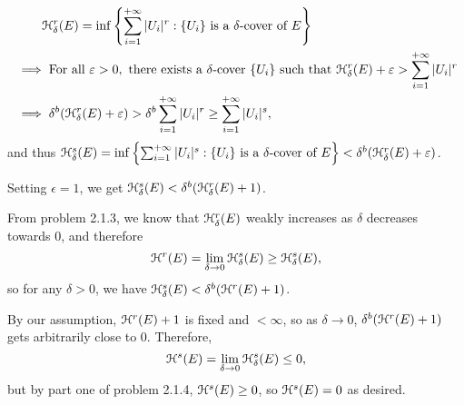\begin{enumerate}
    \begin{align*}
        &\phantom{\implies} \mathcal{H}_\delta^r(E) = \inf \left\{\sum_{i = 1}^{+\infty} |U_i|^r : \{U_i\} \text{ is a } \delta \text{-cover of } E\right\}\\
        &\implies \text{For all }\varepsilon > 0, \text{ there exists a }\delta\text{-cover }\{U_i\} \text{ such that } \mathcal{H}_{\delta}^r(E) + \varepsilon > \sum_{i = 1}^{+\infty} |U_i|^r\\
        &\implies \delta^b (\mathcal{H}_\delta^r(E) + \varepsilon) > \delta^b \sum_{i = 1}^{+\infty} |U_i|^r \geq \sum_{i = 1}^{+\infty} |U_i|^s,
    \end{align*}
    and thus \(\mathcal{H}_\delta^s(E) = \inf \left\{\sum_{i = 1}^{+\infty} |U_i|^s : \{U_i\} \text{ is a } \delta \text{-cover of } E\right\} < \delta^b (\mathcal{H}_\delta^r(E) + \varepsilon)\).

    Setting \(\epsilon = 1\), we get \(\mathcal{H}_\delta^s(E) < \delta^b (\mathcal{H}_\delta^r(E) + 1)\).

    From problem 2.1.3, we know that \(\mathcal{H}_\delta^r(E)\) weakly increases as \(\delta\) decreases towards 0, and therefore
    \[
    \mathcal{H}^r(E) = \lim_{\delta \to 0} \mathcal{H}_\delta^s(E) \geq \mathcal{H}_\delta^s(E),
    \]
    so for any \(\delta > 0\), we have \(\mathcal{H}_\delta^s(E) < \delta^b (\mathcal{H}^r(E) + 1)\).

    By our assumption, \(\mathcal{H}^r(E) + 1\) is fixed and \(< \infty\), so as \(\delta \to 0\), \(\delta^b(\mathcal{H}^r(E) + 1)\) gets arbitrarily close to 0. Therefore,
    \[
    \mathcal{H}^s(E) = \lim_{\delta \to 0} \mathcal{H}_{\delta}^s (E) \leq 0,
    \]
    but by part one of problem 2.1.4, \(\mathcal{H}^s(E) \geq 0\), so \(\mathcal{H}^s(E) = 0\) as desired.
\end{enumerate}